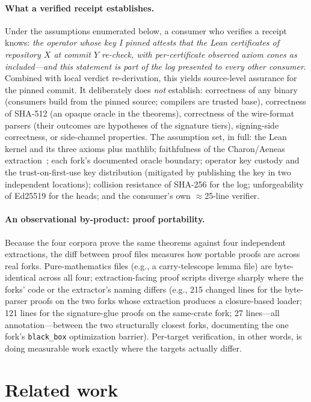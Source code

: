 \documentclass[10pt,twocolumn]{article}
\newcommand{\code}[1]{\texttt{\small #1}}
\begin{document}
\paragraph{What a verified receipt establishes.} Under the assumptions
enumerated below, a consumer who verifies a receipt knows: \emph{the
operator whose key I pinned attests that the Lean certificates of
repository $X$ at commit $Y$ re-check, with per-certificate observed
axiom cones as included---and this statement is part of the log
presented to every other consumer}. Combined with local verdict
re-derivation, this yields source-level assurance for the pinned
commit. It deliberately does \emph{not} establish: correctness of any
binary (consumers build from the pinned source; compilers are trusted
base), correctness of SHA-512 (an opaque oracle in the theorems),
correctness of the wire-format parsers (their outcomes are hypotheses of
the signature tiers), signing-side correctness, or side-channel
properties. The assumption set, in full: the Lean kernel and its three
axioms plus mathlib; faithfulness of the Charon/Aeneas
extraction~\cite{aeneas}; each fork's documented oracle boundary;
operator key custody and the trust-on-first-use key distribution
(mitigated by publishing the key in two independent locations);
collision resistance of SHA-256 for the log; unforgeability of Ed25519
for the heads; and the consumer's own $\approx$25-line verifier.

\paragraph{An observational by-product: proof portability.} Because the
four corpora prove the same theorems against four independent
extractions, the diff between proof files measures how portable proofs
are across real forks. Pure-mathematics files (e.g., a carry-telescope
lemma file) are byte-identical across all four; extraction-facing proof
scripts diverge sharply where the forks' code or the extractor's naming
differs (e.g., 215 changed lines for the byte-parser proofs on the two
forks whose extraction produces a closure-based loader; 121 lines for
the signature-glue proofs on the same-crate fork; 27 lines---all
annotation---between the two structurally closest forks, documenting the
one fork's \code{black\_box} optimization barrier). Per-target
verification, in other words, is doing measurable work exactly where the
targets actually differ.

\section{Related work}
\label{sec:related}
\end{document}
